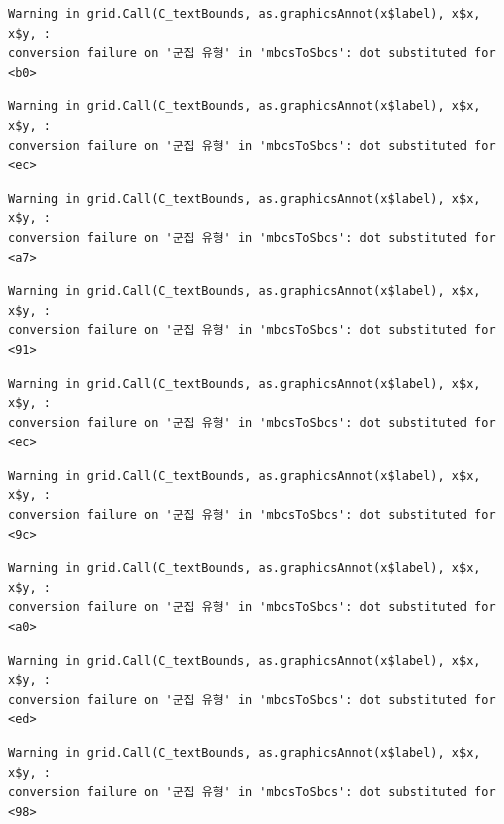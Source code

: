 \documentclass[
  letterpaper,
  DIV=11,
  numbers=noendperiod]{scrreprt}
\begin{document}
\begin{verbatim}
Warning in grid.Call(C_textBounds, as.graphicsAnnot(x$label), x$x, x$y, :
conversion failure on '군집 유형' in 'mbcsToSbcs': dot substituted for <b0>
\end{verbatim}

\begin{verbatim}
Warning in grid.Call(C_textBounds, as.graphicsAnnot(x$label), x$x, x$y, :
conversion failure on '군집 유형' in 'mbcsToSbcs': dot substituted for <ec>
\end{verbatim}

\begin{verbatim}
Warning in grid.Call(C_textBounds, as.graphicsAnnot(x$label), x$x, x$y, :
conversion failure on '군집 유형' in 'mbcsToSbcs': dot substituted for <a7>
\end{verbatim}

\begin{verbatim}
Warning in grid.Call(C_textBounds, as.graphicsAnnot(x$label), x$x, x$y, :
conversion failure on '군집 유형' in 'mbcsToSbcs': dot substituted for <91>
\end{verbatim}

\begin{verbatim}
Warning in grid.Call(C_textBounds, as.graphicsAnnot(x$label), x$x, x$y, :
conversion failure on '군집 유형' in 'mbcsToSbcs': dot substituted for <ec>
\end{verbatim}

\begin{verbatim}
Warning in grid.Call(C_textBounds, as.graphicsAnnot(x$label), x$x, x$y, :
conversion failure on '군집 유형' in 'mbcsToSbcs': dot substituted for <9c>
\end{verbatim}

\begin{verbatim}
Warning in grid.Call(C_textBounds, as.graphicsAnnot(x$label), x$x, x$y, :
conversion failure on '군집 유형' in 'mbcsToSbcs': dot substituted for <a0>
\end{verbatim}

\begin{verbatim}
Warning in grid.Call(C_textBounds, as.graphicsAnnot(x$label), x$x, x$y, :
conversion failure on '군집 유형' in 'mbcsToSbcs': dot substituted for <ed>
\end{verbatim}

\begin{verbatim}
Warning in grid.Call(C_textBounds, as.graphicsAnnot(x$label), x$x, x$y, :
conversion failure on '군집 유형' in 'mbcsToSbcs': dot substituted for <98>
\end{verbatim}
\end{document}
